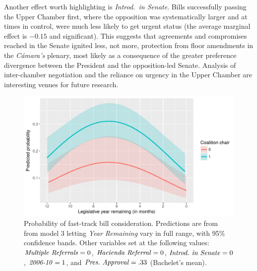 \documentclass[letter,12pt]{article}
\begin{document}

Another effect worth highlighting is \emph{Introd.\ in Senate}. Bills successfully passing the Upper Chamber first, where the opposition was systematically larger and at times in control, were much less likely to get urgent status (the average marginal effect is $-0.15$ and significant). This suggests that agreements and compromises reached in the Senate ignited less, not more, protection from floor amendments in the \emph{Cámara's} plenary, most likely as a consequence of the greater preference divergence between the President and the opposition-led Senate. Analysis of inter-chamber negotiation and the reliance on urgency in the Upper Chamber are interesting venues for future research. 

\begin{figure}
  \centering
    \caption{Probability of fast-track bill consideration. Predictions are from from model 3 letting \emph{Year Remaining} vary in full range, with 95\% confidence bands. Other variables set at the following values: $\text{\emph{Multiple Referrals}}=0$, $\text{\emph{Hacienda Referral}}=0$, $\text{\emph{Introd.~in~Senate}}=0$, $\text{\emph{2006-10}}=1$, and $\text{\emph{Pres.~Approval}}=.33$ (Bachelet's mean).}\label{F:sims}
    \includegraphics[width=.75\columnwidth]{../graphs/predictedPr.pdf}
\end{figure}
\end{document}
